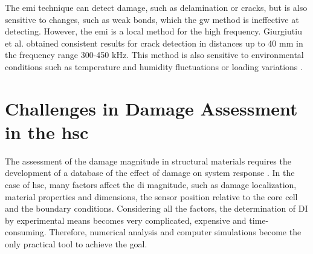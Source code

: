 \documentclass[11pt,a4paper,final]{report}
\begin{document}
The \ac{emi} technique can detect damage, such as delamination or cracks, but is also sensitive to changes, such as weak bonds, which the \ac{gw} method is ineffective at detecting.
However, the \ac{emi} is a local method for the high frequency.
Giurgiutiu et al. \cite{giurgiutiu2001electro} obtained consistent results for crack detection in distances up to 40 mm in the frequency range 300-450 kHz. 
This method is also sensitive to environmental conditions such as temperature and humidity fluctuations\cite{bhalla2002practical} or loading variations \cite{lim2011impedance}.

%
 \section{Challenges in Damage Assessment in the \ac{hsc}}
\label{sec:challenges}

The assessment of the damage magnitude in structural materials requires the development of a database of the effect of damage on system response \cite{worden2007fundamental}.
In the case of \ac{hsc}, many factors affect the \ac{di} magnitude, such as damage localization, material properties and dimensions, the sensor position relative to the core cell and the boundary conditions.
Considering all the factors, the determination of DI by experimental means becomes very complicated, expensive and time-consuming.
Therefore, numerical analysis and computer simulations become the only practical tool to achieve the goal.
\end{document}
